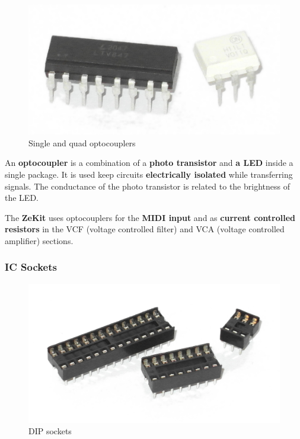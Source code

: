 \documentclass{scrartcl}
\begin{document}
\begin{figure}[!ht]
    \begin{center}
        \includegraphics[scale=0.18]{assets/zekit-optocouplers.jpg}
        \caption{Single and quad optocouplers}
    \end{center}
\end{figure}

An \textbf{optocoupler} is a combination of a \textbf{photo transistor} and \textbf{a LED} inside a single package. It is used keep circuits \textbf{electrically isolated} while transferring signals. The conductance of the photo transistor is related to the brightness of the LED.

The \textbf{ZeKit} uses optocouplers for the \textbf{MIDI input} and as \textbf{current controlled resistors} in the VCF (voltage controlled filter) and VCA (voltage controlled amplifier) sections.

\pagebreak
\subsubsection{IC Sockets}

\begin{figure}[!ht]
    \begin{center}
        \includegraphics[scale=0.17]{assets/zekit-sockets.jpg}
        \caption{DIP sockets}
    \end{center}
\end{figure}
\end{document}

